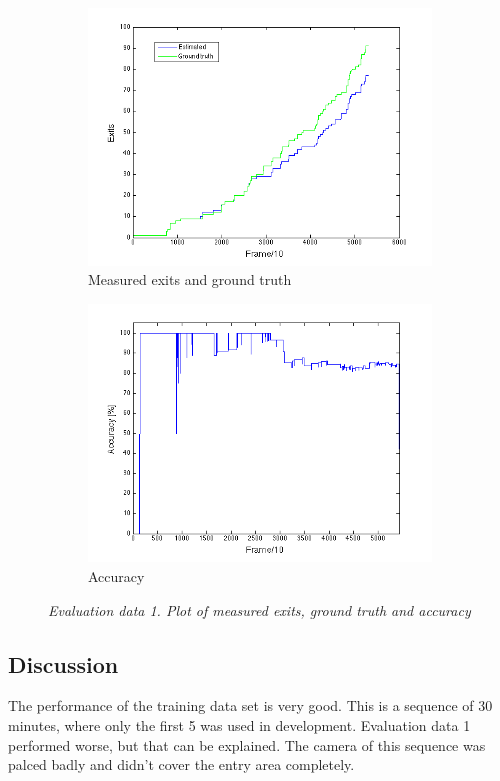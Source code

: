 \begin{figure}[H]
\centering
\begin{subfigure}{.5\textwidth}
  \centering
  \includegraphics[width=.8\linewidth]{images/ExitsEval.png}
  \caption{Measured exits and ground truth}
  \label{fig:sub1}
\end{subfigure}%
\begin{subfigure}{.5\textwidth}
  \centering
  \includegraphics[width=.8\linewidth]{images/AccExitsEval.png}
  \caption{Accuracy}
  \label{fig:sub2}
\end{subfigure}
\caption[Entries evaluation]{\textit{Evaluation data 1. Plot of measured exits, ground truth and accuracy}}
\label{fig:Exits evaluation}
\end{figure}

\subsection{Discussion}
The performance of the training data set is very good. This is a sequence of 30 minutes, where only the first 5  was used in development. Evaluation data 1 performed worse, but that can be explained. The camera of this sequence was palced badly and didn't cover the entry area completely. 


